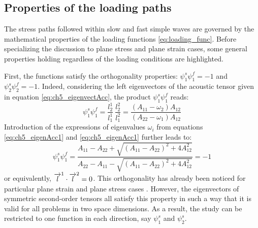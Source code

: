 
\subsection{Properties of the loading paths}
The stress paths followed within slow and fast simple waves are governed by the mathematical properties of the loading functions \eqref{eq:loading_func}.
Before specializing the discussion to plane stress and plane strain cases, some general properties holding regardless of the loading conditions are highlighted.

First, the functions satisfy the orthogonality properties: $\psi^s_1\psi^f_1=-1$ and $\psi^s_2\psi^f_2=-1$.
Indeed, considering the left eigenvectors of the acoustic tensor given in equation \eqref{eq:ch5_eigenvectAcc}, the product $\psi^s_1\psi^f_1$ reads:
\begin{equation*}
  \psi^s_1\psi^f_1 = \frac{l^1_2}{l^1_1}\: \frac{l_2^2}{l^2_1} = \frac{(A_{11}-\omega_2)A_{12}}{(A_{22}-\omega_1)A_{12}}
\end{equation*}
Introduction of the expressions of eigenvalues $\omega_i$ from equations \eqref{eq:ch5_eigenAcc1} and \eqref{eq:ch5_eigenAcc1} further leads to:
\begin{equation*}
  \psi^s_1\psi^f_1 = \frac{A_{11} -A_{22} +\sqrt{(A_{11} -A_{22} )^2 + 4A_{12}^2 }}{A_{22} -A_{11} -\sqrt{(A_{11} -A_{22} )^2 + 4A_{12}^2 }}=-1
\end{equation*}
or equivalently, ${\overrightarrow{l}}^1 \cdot {\overrightarrow{l}}^2=0$.
This orthogonality has already been noticed for particular plane strain and plane stress cases \cite{Clifton,Ting68}. %
However, the eigenvectors of symmetric second-order tensors all satisfy this property in such a way that it is valid for all problems in two space dimensions.
As a result, the study can be restricted to one function in each direction, say $\psi_1^s$ and $\psi_2^s$.

